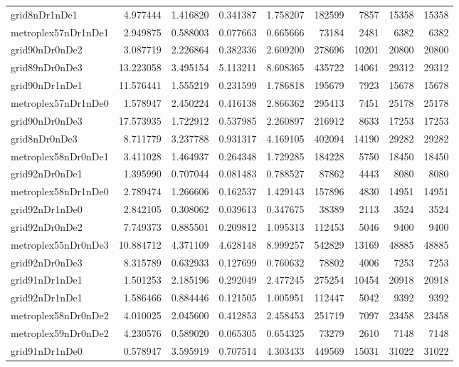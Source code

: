 \begin{longtable}{|l|r|r|r|r|r|r|r|r|}
grid8nDr1nDe1 & 4.977444 & 1.416820 & 0.341387 & 1.758207 & 182599 & 7857 & 15358 & 15358 \\
metroplex57nDr1nDe1 & 2.949875 & 0.588003 & 0.077663 & 0.665666 & 73184 & 2481 & 6382 & 6382 \\
grid90nDr0nDe2 & 3.087719 & 2.226864 & 0.382336 & 2.609200 & 278696 & 10201 & 20800 & 20800 \\
grid89nDr0nDe3 & 13.223058 & 3.495154 & 5.113211 & 8.608365 & 435722 & 14061 & 29312 & 29312 \\
grid90nDr1nDe1 & 11.576441 & 1.555219 & 0.231599 & 1.786818 & 195679 & 7923 & 15678 & 15678 \\
metroplex57nDr1nDe0 & 1.578947 & 2.450224 & 0.416138 & 2.866362 & 295413 & 7451 & 25178 & 25178 \\
grid90nDr0nDe3 & 17.573935 & 1.722912 & 0.537985 & 2.260897 & 216912 & 8633 & 17253 & 17253 \\
grid8nDr0nDe3 & 8.711779 & 3.237788 & 0.931317 & 4.169105 & 402094 & 14190 & 29282 & 29282 \\
metroplex58nDr0nDe1 & 3.411028 & 1.464937 & 0.264348 & 1.729285 & 184228 & 5750 & 18450 & 18450 \\
grid92nDr0nDe1 & 1.395990 & 0.707044 & 0.081483 & 0.788527 & 87862 & 4443 & 8080 & 8080 \\
metroplex58nDr1nDe0 & 2.789474 & 1.266606 & 0.162537 & 1.429143 & 157896 & 4830 & 14951 & 14951 \\
grid92nDr1nDe0 & 2.842105 & 0.308062 & 0.039613 & 0.347675 & 38389 & 2113 & 3524 & 3524 \\
grid92nDr0nDe2 & 7.749373 & 0.885501 & 0.209812 & 1.095313 & 112453 & 5046 & 9400 & 9400 \\
metroplex55nDr0nDe3 & 10.884712 & 4.371109 & 4.628148 & 8.999257 & 542829 & 13169 & 48885 & 48885 \\
grid92nDr0nDe3 & 8.315789 & 0.632933 & 0.127699 & 0.760632 & 78802 & 4006 & 7253 & 7253 \\
grid91nDr1nDe1 & 1.501253 & 2.185196 & 0.292049 & 2.477245 & 275254 & 10454 & 20918 & 20918 \\
grid92nDr1nDe1 & 1.586466 & 0.884446 & 0.121505 & 1.005951 & 112447 & 5042 & 9392 & 9392 \\
metroplex58nDr0nDe2 & 4.010025 & 2.045600 & 0.412853 & 2.458453 & 251719 & 7097 & 23458 & 23458 \\
metroplex59nDr0nDe2 & 4.230576 & 0.589020 & 0.065305 & 0.654325 & 73279 & 2610 & 7148 & 7148 \\
grid91nDr1nDe0 & 0.578947 & 3.595919 & 0.707514 & 4.303433 & 449569 & 15031 & 31022 & 31022 \\

\end{longtable}
